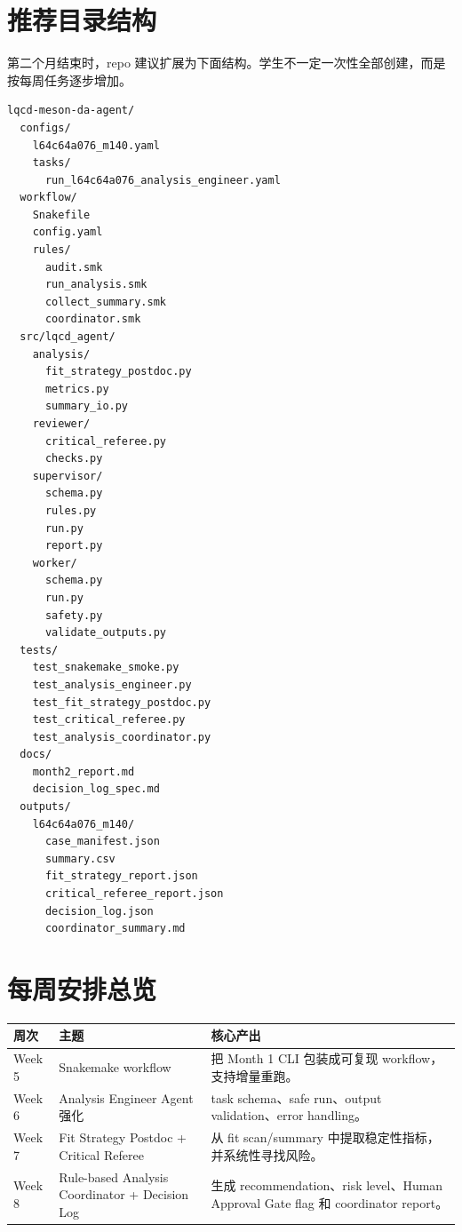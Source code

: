 \documentclass[11pt,a4paper,fontset=none]{ctexart}
\begin{document}
\section{推荐目录结构}

第二个月结束时，repo 建议扩展为下面结构。学生不一定一次性全部创建，而是按每周任务逐步增加。

\begin{lstlisting}
lqcd-meson-da-agent/
  configs/
    l64c64a076_m140.yaml
    tasks/
      run_l64c64a076_analysis_engineer.yaml
  workflow/
    Snakefile
    config.yaml
    rules/
      audit.smk
      run_analysis.smk
      collect_summary.smk
      coordinator.smk
  src/lqcd_agent/
    analysis/
      fit_strategy_postdoc.py
      metrics.py
      summary_io.py
    reviewer/
      critical_referee.py
      checks.py
    supervisor/
      schema.py
      rules.py
      run.py
      report.py
    worker/
      schema.py
      run.py
      safety.py
      validate_outputs.py
  tests/
    test_snakemake_smoke.py
    test_analysis_engineer.py
    test_fit_strategy_postdoc.py
    test_critical_referee.py
    test_analysis_coordinator.py
  docs/
    month2_report.md
    decision_log_spec.md
  outputs/
    l64c64a076_m140/
      case_manifest.json
      summary.csv
      fit_strategy_report.json
      critical_referee_report.json
      decision_log.json
      coordinator_summary.md
\end{lstlisting}

\section{每周安排总览}

\begin{longtable}{p{}p{}p{}}
\toprule
\textbf{周次} & \textbf{主题} & \textbf{核心产出} \\
\midrule
Week 5 & Snakemake workflow & 把 Month 1 CLI 包装成可复现 workflow，支持增量重跑。 \\
Week 6 & Analysis Engineer Agent 强化 & task schema、safe run、output validation、error handling。 \\
Week 7 & Fit Strategy Postdoc + Critical Referee & 从 fit scan/summary 中提取稳定性指标，并系统性寻找风险。 \\
Week 8 & Rule-based Analysis Coordinator + Decision Log & 生成 recommendation、risk level、Human Approval Gate flag 和 coordinator report。 \\
\bottomrule
\end{longtable}
\end{document}
